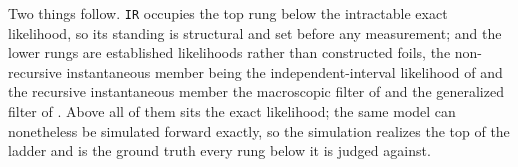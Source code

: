 Two things follow. \texttt{IR} occupies the top rung below the intractable exact likelihood, so
its standing is structural and set before any measurement; and the lower rungs are established
likelihoods rather than constructed foils, the non-recursive instantaneous member being the
independent-interval likelihood of \citet{milescu2005maximum} and the recursive instantaneous
member the macroscopic filter of \citet{moffatt2007estimation} and the generalized filter of
\citet{munch2022bayesian}. Above all of them sits the exact likelihood; the same model can
nonetheless be simulated forward exactly, so the simulation realizes the top of the ladder and is
the ground truth every rung below it is judged against.

